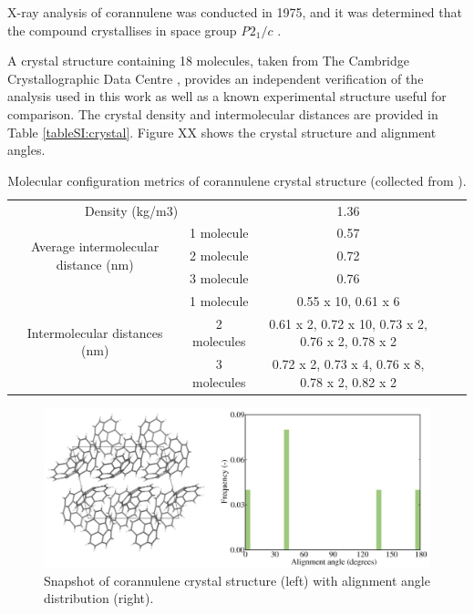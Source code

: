 X-ray analysis of corannulene was conducted in 1975, and it was determined that the compound crystallises in space group \textit{P}$2_{1}/c$ \cite{hanson1976crystal}.

A crystal structure containing 18 molecules, taken from The Cambridge Crystallographic Data Centre \cite{CORANN11unitcell}, provides an independent verification of the analysis used in this work as well as a known experimental structure useful for comparison.  The crystal density and intermolecular distances are provided in Table \ref{tableSI:crystal}.  Figure XX shows the crystal structure and alignment angles.

\begin{table}[]
\centering
\caption{Molecular configuration metrics of corannulene crystal structure (collected from \cite{CORANN11unitcell}).}
\label{table:crystal}
\begin{tabular}{cc|cll}
\multicolumn{2}{c}{Density (kg/m3)} & 1.36 \cite{CORANN11unitcell}&  &  \\ \cline{1-3}
\multirow{3}{*}{Average intermolecular distance (nm)} & 1 molecule & 0.57 &  &  \\
 & 2 molecule & 0.72 &  &  \\
 & 3 molecule & 0.76 &  &  \\ \cline{1-3}
\multirow{3}{*}{Intermolecular distances (nm)} & 1 molecule & 0.55 x 10, 0.61 x 6 &  &  \\
 & 2 molecules & 0.61 x 2, 0.72 x 10, 0.73 x 2, 0.76 x 2, 0.78 x 2 &  &  \\
 & 3 molecules & 0.72 x 2, 0.73 x 4, 0.76 x 8, 0.78 x 2, 0.82 x 2 &  & 
\end{tabular}
\end{table}
%
%
\begin{figure}[!tbh]
\centering
\includegraphics[width=0.65\linewidth]{Figures/corannulene_crystal.eps}
\caption{Snapshot of corannulene crystal structure (left) with alignment angle distribution (right).}
\label{figSI:corannulene_crystal}
\end{figure}
%

